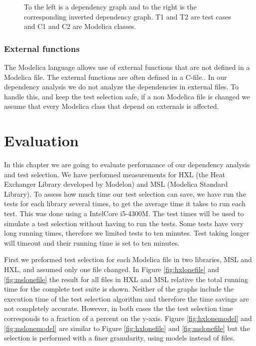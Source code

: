 \documentclass{cslthse-msc}
\begin{document}
\begin{figure}[!htbp]
    \centering
    \qquad
    \caption{To the left is a dependency graph and to the right is the corresponding inverted dependency graph. T1 and T2 are test cases and C1 and C2 are Modelica classes.}
    \label{fig:invertedGraph}
\end{figure}

\subsection{External functions}
The Modelica language allows use of external functions that are not defined in a Modelica file. The external functions are often defined in a C-file.\cite{modelicamodelica}. In our dependency analysis we do not analyze the dependencies in external files. To handle this, and keep the test selection safe, if a non Modelica file is changed we assume that every Modelica class that depend on externals is affected.


\chapter[Evaluation]{Evaluation}
In this chapter we are going to evaluate performance of our dependency analysis and test selection. We have performed measurements for HXL (the Heat Exchanger Library developed by Modelon) and MSL (Modelica Standard Library). To assess how much time our test selection can save, we have run the tests for each library several times, to get the average time it takes to run each test. This was done using a Intel\textregistered Core \texttrademark i5-4300M. The test times will be used to simulate a test selection without having to run the tests. Some tests have very long running times, therefore we limited tests to ten minutes. Test taking longer will timeout and their running time is set to ten minutes.

First we preformed test selection for each Modelica file in two libraries, MSL and HXL, and assumed only one file changed. In Figure \ref{fig:hxlonefile} and \ref{fig:mslonefile} the result for all files in HXL and MSL relative the total running time for the complete test suite is shown. Neither of the graphs include the execution time of the test selection algorithm and therefore the time savings are not completely accurate. However, in both cases the the test selection time corresponds to a fraction of a percent on the y-axis. Figure \ref{fig:hxlonemodel} and \ref{fig:mslonemodel} are similar to Figure \ref{fig:hxlonefile} and \ref{fig:mslonefile} but the selection is performed with a finer granularity, using models instead of files. 
\end{document}
